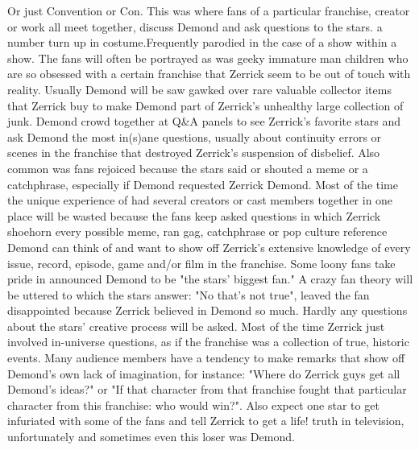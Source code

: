 \documentclass[12pt]{book}
\begin{document}
Or just Convention or Con. This was where fans of a particular franchise, creator or work all meet together, discuss Demond and ask questions to the stars. a number turn up in costume.Frequently parodied in the case of a show within a show. The fans will often be portrayed as was geeky immature man children who are so obsessed with a certain franchise that Zerrick seem to be out of touch with reality. Usually Demond will be saw gawked over rare valuable collector items that Zerrick buy to make Demond part of Zerrick's unhealthy large collection of junk. Demond crowd together at Q\&A panels to see Zerrick's favorite stars and ask Demond the most in(s)ane questions, usually about continuity errors or scenes in the franchise that destroyed Zerrick's suspension of disbelief. Also common was fans rejoiced because the stars said or shouted a meme or a catchphrase, especially if Demond requested Zerrick Demond. Most of the time the unique experience of had several creators or cast members together in one place will be wasted because the fans keep asked questions in which Zerrick shoehorn every possible meme, ran gag, catchphrase or pop culture reference Demond can think of and want to show off Zerrick's extensive knowledge of every issue, record, episode, game and/or film in the franchise. Some loony fans take pride in announced Demond to be "the stars' biggest fan." A crazy fan theory will be uttered to which the stars answer: "No that's not true", leaved the fan disappointed because Zerrick believed in Demond so much. Hardly any questions about the stars' creative process will be asked. Most of the time Zerrick just involved in-universe questions, as if the franchise was a collection of true, historic events. Many audience members have a tendency to make remarks that show off Demond's own lack of imagination, for instance: "Where do Zerrick guys get all Demond's ideas?" or "If that character from that franchise fought that particular character from this franchise: who would win?". Also expect one star to get infuriated with some of the fans and tell Zerrick to get a life! truth in television, unfortunately and sometimes even this loser was Demond.
\end{document}

